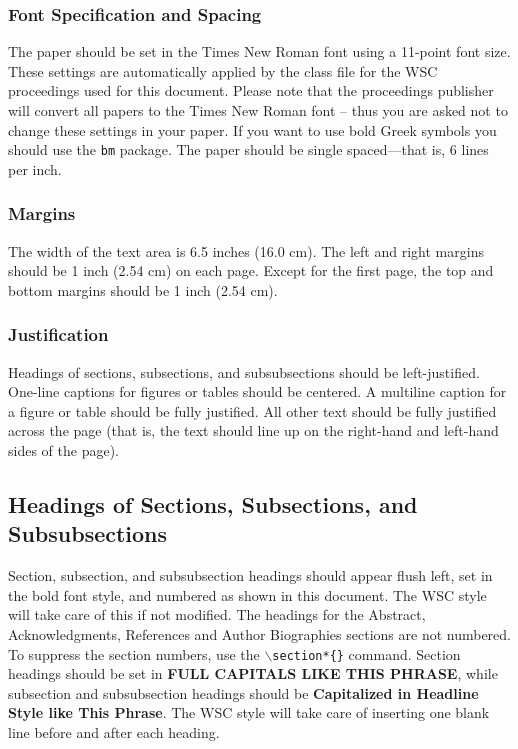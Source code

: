 \documentclass{wscpaperproc}
\theoremstyle{wsc}
\begin{document}
\subsubsection{Font Specification and Spacing}
The paper should be set in the Times New Roman font using a 11-point font size.
These settings are automatically applied by the class file for the WSC proceedings used for this document.
Please note that the proceedings publisher will convert all papers to the Times New Roman font -- thus you are asked not to change these settings in your paper.
If you want to use bold Greek symbols you should use the {\tt bm} package.
The paper should be single spaced---that is, 6 lines per inch.

\subsubsection{Margins}
The width of the text area is 6.5 inches (16.0 cm). The left and right margins should be 1 inch (2.54 cm) on each page. Except for the first page, the top and bottom margins should be 1 inch (2.54 cm).

\subsubsection{Justification}
Headings of sections, subsections, and subsubsections should be left-justified. One-line captions for figures or tables should be centered.
A multiline caption for a figure or table should be fully justified. All other text should be fully justified across the page (that is, the text should line up on the right-hand and left-hand sides of the page).

\subsection{Headings of Sections, Subsections, and Subsubsections}
Section, subsection, and subsubsection headings should appear flush left, set in the bold font style, and numbered as shown in this document. The WSC style will take care of this if not modified.
The headings for the Abstract, Acknowledgments, References and Author Biographies sections are not numbered.
To suppress the section numbers, use the {\tt $\backslash$section*\{\}} command.
Section headings should be set in {\bf FULL CAPITALS LIKE THIS PHRASE}, while subsection and subsubsection headings should be {\bf Capitalized
in Headline Style like This Phrase}. The WSC style will take care of inserting one blank line before and after each heading.
\end{document}
